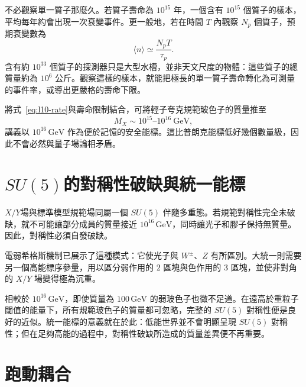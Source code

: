 不必觀察單一質子那麼久。若質子壽命為 \(10^{15}\) 年，一個含有 \(10^{15}\) 個質子的樣本，平均每年約會出現一次衰變事件。更一般地，若在時間 \(T\) 內觀察 \(N_p\) 個質子，預期衰變數為
\begin{equation}
\langle n\rangle\simeq\frac{N_pT}{\tau_p}.
\label{eq:l10-event-count}
\end{equation}
含有約 \(10^{33}\) 個質子的探測器只是大型水槽，並非天文尺度的物體：這些質子的總質量約為 \(10^6\) 公斤。觀察這樣的樣本，就能把極長的單一質子壽命轉化為可測量的事件率，或導出更嚴格的壽命下限。

將式~\eqref{eq:l10-rate}與壽命限制結合，可將輕子夸克規範玻色子的質量推至
\begin{equation}
M_X\sim10^{15}\text{--}10^{16}\ \mathrm{GeV},
\label{eq:l10-mx}
\end{equation}
講義以 \(10^{16}\,\mathrm{GeV}\) 作為便於記憶的安全能標。這比普朗克能標低好幾個數量級，因此不會必然與量子場論相矛盾。

\section{\texorpdfstring{\(SU(5)\)}{SU(5)}的對稱性破缺與統一能標}

\(X/Y\)場與標準模型規範場同屬一個 \(SU(5)\) 伴隨多重態。若規範對稱性完全未破缺，就不可能讓部分成員的質量接近 \(10^{16}\,\mathrm{GeV}\)，同時讓光子和膠子保持無質量。因此，對稱性必須自發破缺。

\begin{classroomqa}
\end{classroomqa}

電弱希格斯機制已展示了這種模式：它使光子與 \(W^\pm\)、\(Z\) 有所區別。大統一則需要另一個高能標序參量，用以區分弱作用的 \(2\) 區塊與色作用的 \(3\) 區塊，並使非對角的 \(X/Y\) 場變得極為沉重。

相較於 \(10^{16}\,\mathrm{GeV}\)，即使質量為 \(100\,\mathrm{GeV}\) 的弱玻色子也微不足道。在遠高於重粒子閾值的能量下，所有規範玻色子的質量都可忽略，完整的 \(SU(5)\) 對稱性便是良好的近似。統一能標的意義就在於此：低能世界並不會明顯呈現 \(SU(5)\) 對稱性；但在足夠高能的過程中，對稱性破缺所造成的質量差異便不再重要。

\section{跑動耦合}

